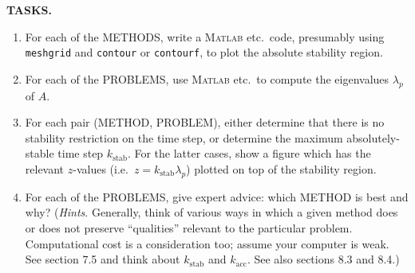\documentclass[11pt]{amsart}
\newcommand{\Matlab}{\textsc{Matlab}\xspace}
\begin{document}
\bigskip
\noindent \textbf{TASKS.}
\renewcommand{\labelenumi}{\alph{enumi})\,}
\begin{enumerate}
\item For each of the METHODS, write a \Matlab etc.~code, presumably using \texttt{meshgrid} and \texttt{contour} or \texttt{contourf}, to plot the absolute stability region.
\item For each of the PROBLEMS, use \Matlab etc.~to compute the eigenvalues $\lambda_p$ of $A$.
\item For each pair (METHOD, PROBLEM), either determine that there is no stability restriction on the time step, or determine the maximum absolutely-stable time step $k_{\text{stab}}$.  For the latter cases, show a figure which has the relevant $z$-values (i.e.~$z=k_{\text{stab}} \lambda_p$) plotted on top of the stability region.
\item For each of the PROBLEMS, give expert advice: which METHOD is best and why?  (\emph{Hints}.  Generally, think of various ways in which a given method does or does not preserve ``qualities'' relevant to the particular problem.  Computational cost is a consideration too; assume your computer is weak.  See section 7.5 and think about $k_{\text{stab}}$ and $k_{\text{acc}}$.  See also sections 8.3 and 8.4.)
\end{enumerate}

\vfill
\end{document}
